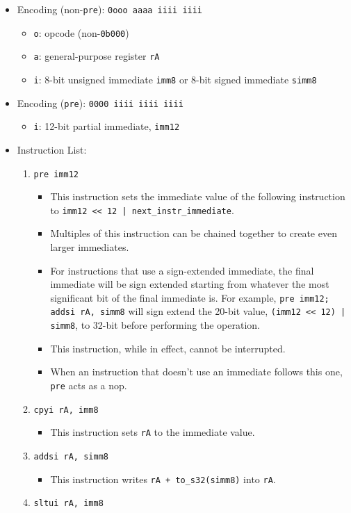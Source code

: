 \documentclass{article}
\begin{document}
		\begin{itemize}
		\item Encoding (non-\texttt{pre}):  \texttt{0ooo aaaa iiii iiii}
			\begin{itemize}
			\item \texttt{o}:  opcode (non-\texttt{0b000})
			\item \texttt{a}:  general-purpose register \texttt{rA}
			\item \texttt{i}:  8-bit unsigned immediate \texttt{imm8} or
				8-bit signed immediate \texttt{simm8}
			\end{itemize}
		\item Encoding (\texttt{pre}):  \texttt{0000 iiii iiii iiii}
			\begin{itemize}
			\item \texttt{i}:  12-bit partial immediate, \texttt{imm12}
			\end{itemize}
		\item Instruction List:
			\begin{enumerate}
			\item \texttt{pre imm12}
				\begin{itemize}
				\item This instruction sets the immediate value of the
					following instruction to
					\texttt{{imm12 << 12} | next\_instr\_immediate}.
				\item Multiples of this instruction can be chained together
					to create even larger immediates.
				\item For instructions that use a sign-extended immediate,
					the final immediate will be sign extended starting from
					whatever the most significant bit of the final
					immediate is.  For example,
					\texttt{pre imm12; addsi rA, simm8}
					will sign extend the 20-bit value,
					\texttt{(imm12 << 12) | simm8}, to 32-bit before
					performing the operation.
				\item This instruction, while in effect, cannot be
					interrupted.
				\item When an instruction that doesn't use an immediate
					follows this one, \texttt{pre} acts as a nop.
				\end{itemize}
			\item \texttt{cpyi rA, imm8}
				\begin{itemize}
				\item This instruction sets \texttt{rA} to the immediate
					value.
				\end{itemize}
			\item \texttt{addsi rA, simm8}
				\begin{itemize}
				\item This instruction writes \texttt{rA + to\_s32(simm8)}
					into \texttt{rA}.
				\end{itemize}
			\item \texttt{sltui rA, imm8}


\end{enumerate}
\end{itemize}
\end{document}

